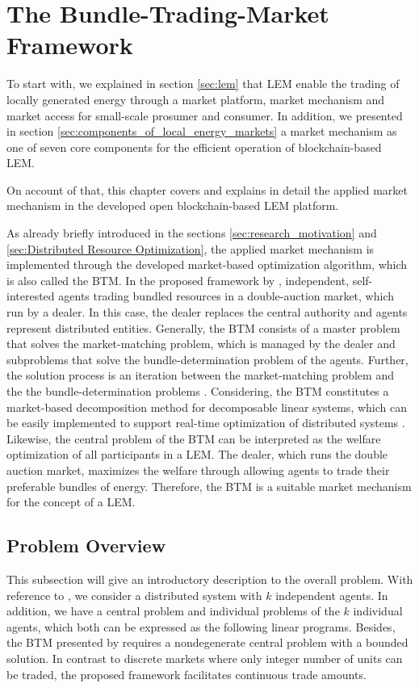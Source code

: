 \section{The Bundle-Trading-Market Framework}
\label{sec:btm}
To start with, we explained in section \ref{sec:lem} that LEM enable the trading 
of locally generated energy through a market platform, market mechanism and market access for 
small-scale prosumer and consumer. 
In addition, we presented in section \ref{sec:components_of_local_energy_markets} 
a market mechanism as one of seven core components for the efficient operation of blockchain-based
LEM.

On account of that, this chapter covers and explains in detail the applied market mechanism in the developed open blockchain-based LEM platform. 

As already briefly introduced in the sections \ref{sec:research_motivation} 
and \ref{sec:Distributed Resource Optimization}, the applied market mechanism is implemented 
through the developed market-based optimization algorithm, which is also called the 
BTM. 
In the proposed framework by , independent, self-interested
agents trading bundled resources in a double-auction market, which run by a dealer. 
In this case, the dealer replaces the central authority and agents represent distributed
entities. Generally, the BTM consists of a master problem that solves the market-matching problem, which is managed by the dealer
and subproblems that solve the bundle-determination problem of the agents.
Further, the solution process is an iteration between the market-matching problem and the 
the bundle-determination problems .
Considering, the BTM constitutes a market-based decomposition method 
for decomposable linear systems,
which can be easily implemented to support real-time optimization 
of distributed systems .
Likewise, the central problem of the BTM can be interpreted as the welfare optimization of all participants in a LEM. 
The dealer, which runs the double auction market, maximizes the welfare through allowing 
agents to trade their preferable bundles of energy.
Therefore, the BTM is a suitable market mechanism for the concept of a LEM.

\subsection{Problem Overview}
\label{sec:btm_problem_overview}
This subsection will give an introductory description to the overall problem. 
With reference to , we consider a distributed 
system with $k$ independent agents.
In addition, we have a central problem and individual problems of the $k$ individual agents, which both can be expressed as the following linear programs. Besides, the BTM presented by  requires 
a nondegenerate central problem with a bounded solution. In contrast to discrete markets where only integer number of units can be traded, the proposed framework facilitates continuous trade amounts. 

